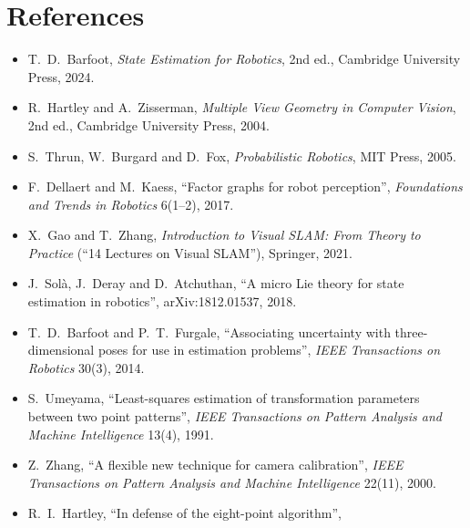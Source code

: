\chapter*{References}

\begin{description}[leftmargin=1.5em,style=nextline,font=\normalfont]
\item[Textbooks]
\begin{itemize}[nosep]
\item T.~D.~Barfoot, \emph{State Estimation for Robotics}, 2nd ed.,
  Cambridge University Press, 2024.
\item R.~Hartley and A.~Zisserman, \emph{Multiple View Geometry in
  Computer Vision}, 2nd ed., Cambridge University Press, 2004.
\item S.~Thrun, W.~Burgard and D.~Fox, \emph{Probabilistic Robotics},
  MIT Press, 2005.
\item F.~Dellaert and M.~Kaess, ``Factor graphs for robot perception'',
  \emph{Foundations and Trends in Robotics} 6(1--2), 2017.
\item X.~Gao and T.~Zhang, \emph{Introduction to Visual SLAM: From
  Theory to Practice} (``14 Lectures on Visual SLAM''), Springer, 2021.
\end{itemize}
\item[Lie groups]
\begin{itemize}[nosep]
\item J.~Sol\`a, J.~Deray and D.~Atchuthan, ``A micro Lie theory for
  state estimation in robotics'', arXiv:1812.01537, 2018.
\item T.~D.~Barfoot and P.~T.~Furgale, ``Associating uncertainty with
  three-dimensional poses for use in estimation problems'', \emph{IEEE
  Transactions on Robotics} 30(3), 2014.
\item S.~Umeyama, ``Least-squares estimation of transformation parameters
  between two point patterns'', \emph{IEEE Transactions on Pattern
  Analysis and Machine Intelligence} 13(4), 1991.
\end{itemize}
\item[Cameras and calibration]
\begin{itemize}[nosep]
\item Z.~Zhang, ``A flexible new technique for camera calibration'',
  \emph{IEEE Transactions on Pattern Analysis and Machine Intelligence}
  22(11), 2000.
\item R.~I.~Hartley, ``In defense of the eight-point algorithm'',

\end{itemize}
\end{description}
